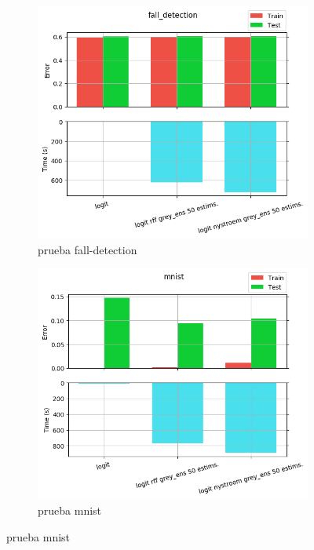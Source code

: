 \begin{figure}[ht]
  \centering
  \begin{subfigure}[b]{0.5\linewidth}
    \centering\includegraphics[width=\imgscale\linewidth]{Figures/2_4/fall_detection}
    \caption{prueba fall-detection}
    \label{fig:2_4_fall_detection}
  \end{subfigure}%
  \begin{subfigure}[b]{0.5\linewidth}
    \centering\includegraphics[width=\imgscale\linewidth]{Figures/2_4/mnist}
    \caption{prueba mnist}
    \label{fig:2_4_mnist}
  \end{subfigure}
\end{figure}


